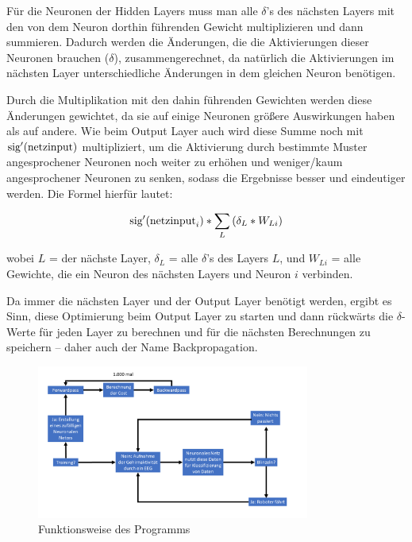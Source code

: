 \documentclass{scrartcl}
\begin{document}
	Für die Neuronen der Hidden Layers muss man alle $\delta$'s des nächsten Layers mit den von dem Neuron dorthin führenden Gewicht multiplizieren und dann summieren. Dadurch werden die Änderungen, die die Aktivierungen dieser Neuronen brauchen ($\delta$), zusammengerechnet, da natürlich die Aktivierungen im nächsten Layer unterschiedliche Änderungen in dem gleichen Neuron benötigen.
	
	Durch die Multiplikation mit den dahin führenden Gewichten werden diese Änderungen gewichtet, da sie auf einige Neuronen größere Auswirkungen haben als auf andere. Wie beim Output Layer auch wird diese Summe noch mit $\textrm{sig}'(\textrm{netzinput})$ multipliziert, um die Aktivierung durch bestimmte Muster angesprochener Neuronen noch weiter zu erhöhen und weniger/kaum angesprochener Neuronen zu senken, sodass die Ergebnisse besser und eindeutiger werden. Die Formel hierfür lautet:

	{\Large \[\textrm{sig}'({\textrm{netzinput}}_i) * \sum_{L}{\left(\delta_L\ast W_{Li}\right)}\]}

	\noindent wobei $L$ = der nächste Layer, $\delta_L$ = alle $\delta$'s des Layers $L$, und $W_{Li}$ = alle Gewichte, die ein Neuron des nächsten Layers und Neuron $i$ verbinden.


	Da immer die nächsten Layer und der Output Layer benötigt werden, ergibt es Sinn, diese Optimierung beim Output Layer zu starten und dann rückwärts die \mbox{$\delta$-Werte} für jeden Layer zu berechnen und für die nächsten Berechnungen zu speichern -- daher auch der Name Backpropagation. \cite{MITNeuronale} \cite{3b1b:fft} \cite{brotcrunsher:backwardpass}

	\begin{figure}[H]
		\centering
		\includegraphics[width=0.8\textwidth]{pictures/Abbildung-des-Programms.png}
		\caption{Funktionsweise des Programms}
	\end{figure}


	\newpage
\end{document}
